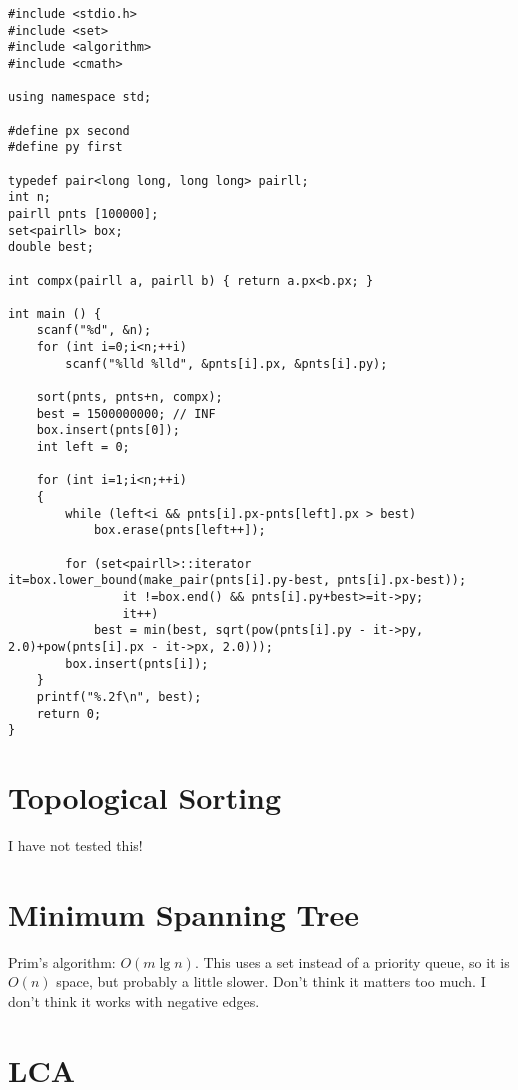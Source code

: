 \documentclass[a4paper,final,8pt]{article}
\begin{document}
\begin{lstlisting}
#include <stdio.h>
#include <set>
#include <algorithm>
#include <cmath>

using namespace std;

#define px second
#define py first

typedef pair<long long, long long> pairll;
int n;
pairll pnts [100000];
set<pairll> box;
double best;

int compx(pairll a, pairll b) { return a.px<b.px; }

int main () {
    scanf("%d", &n);
    for (int i=0;i<n;++i)
        scanf("%lld %lld", &pnts[i].px, &pnts[i].py);

    sort(pnts, pnts+n, compx);
    best = 1500000000; // INF
    box.insert(pnts[0]);
    int left = 0;

    for (int i=1;i<n;++i)
    {
        while (left<i && pnts[i].px-pnts[left].px > best)
            box.erase(pnts[left++]);

        for (set<pairll>::iterator it=box.lower_bound(make_pair(pnts[i].py-best, pnts[i].px-best));
                it !=box.end() && pnts[i].py+best>=it->py;
                it++)
            best = min(best, sqrt(pow(pnts[i].py - it->py, 2.0)+pow(pnts[i].px - it->px, 2.0)));
        box.insert(pnts[i]);
    }
    printf("%.2f\n", best);
    return 0;
}
\end{lstlisting}


\section{Topological Sorting}

I have not tested this!




\section{Minimum Spanning Tree}

Prim's algorithm: $O(m\lg n)$. This uses a set instead of a priority queue,
so it is $O(n)$ space, but probably a little slower. Don't think it matters
too much. I don't think it works with negative edges.




\section{LCA}
\end{document}
